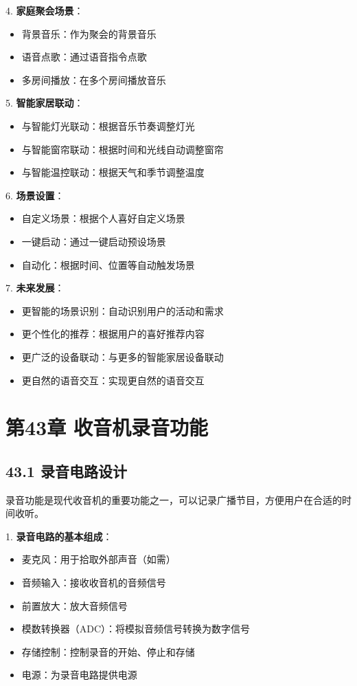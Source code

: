 \documentclass[12pt,UTF8]{ctexbook}
\begin{document}
4. \textbf{家庭聚会场景}：
   \begin{itemize}[leftmargin=3.5em]
   \item 背景音乐：作为聚会的背景音乐
   \item 语音点歌：通过语音指令点歌
   \item 多房间播放：在多个房间播放音乐
   \end{itemize}

5. \textbf{智能家居联动}：
   \begin{itemize}[leftmargin=3.5em]
   \item 与智能灯光联动：根据音乐节奏调整灯光
   \item 与智能窗帘联动：根据时间和光线自动调整窗帘
   \item 与智能温控联动：根据天气和季节调整温度
   \end{itemize}

6. \textbf{场景设置}：
   \begin{itemize}[leftmargin=3.5em]
   \item 自定义场景：根据个人喜好自定义场景
   \item 一键启动：通过一键启动预设场景
   \item 自动化：根据时间、位置等自动触发场景
   \end{itemize}

7. \textbf{未来发展}：
   \begin{itemize}[leftmargin=3.5em]
   \item 更智能的场景识别：自动识别用户的活动和需求
   \item 更个性化的推荐：根据用户的喜好推荐内容
   \item 更广泛的设备联动：与更多的智能家居设备联动
   \item 更自然的语音交互：实现更自然的语音交互
   \end{itemize}

\chapter*{第43章 收音机录音功能}
\section*{43.1 录音电路设计}

录音功能是现代收音机的重要功能之一，可以记录广播节目，方便用户在合适的时间收听。

1. \textbf{录音电路的基本组成}：
   \begin{itemize}[leftmargin=3.5em]
   \item 麦克风：用于拾取外部声音（如需）
   \item 音频输入：接收收音机的音频信号
   \item 前置放大：放大音频信号
   \item 模数转换器（ADC）：将模拟音频信号转换为数字信号
   \item 存储控制：控制录音的开始、停止和存储
   \item 电源：为录音电路提供电源
   \end{itemize}
\end{document}
